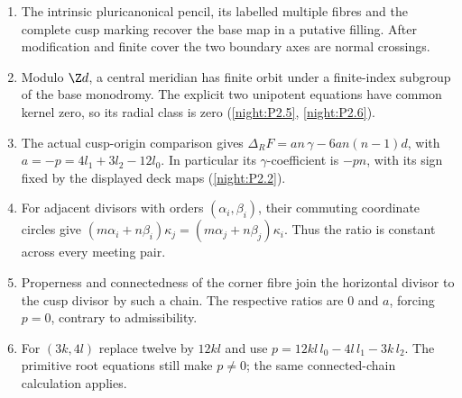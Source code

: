 \RungOne
\begin{enumerate}[label=\arabic*.]
\item The intrinsic pluricanonical pencil, its labelled
multiple fibres and the complete cusp marking recover
the base map in a putative filling. After modification
and finite cover the two boundary axes are normal crossings.
\item Modulo $\Z d$, a central meridian has finite orbit
under a finite-index subgroup of the base monodromy.
The explicit two unipotent equations have common kernel
zero, so its radial class is zero
(\ref{night:P2.5}, \ref{night:P2.6}).
\item The actual cusp-origin comparison gives
$\Delta_RF=an\,\gamma-6an(n-1)d$, with
$a=-p=4l_1+3l_2-12l_0$. In particular its
$\gamma$-coefficient is $-pn$, with its sign fixed by
the displayed deck maps (\ref{night:P2.2}).
\item For adjacent divisors with orders
$(\alpha_i,\beta_i)$, their commuting coordinate circles
give
$(m\alpha_i+n\beta_i)\kappa_j
=(m\alpha_j+n\beta_j)\kappa_i$.
Thus the ratio is constant across every meeting pair.
\item Properness and connectedness of the corner fibre
join the horizontal divisor to the cusp divisor by
such a chain. The respective ratios are $0$ and $a$,
forcing $p=0$, contrary to admissibility.
\item For $(3k,4l)$ replace twelve by $12kl$ and use
$p=12kl\,l_0-4l\,l_1-3k\,l_2$.
The primitive root equations still make $p\ne0$;
the same connected-chain calculation applies.
\end{enumerate}

